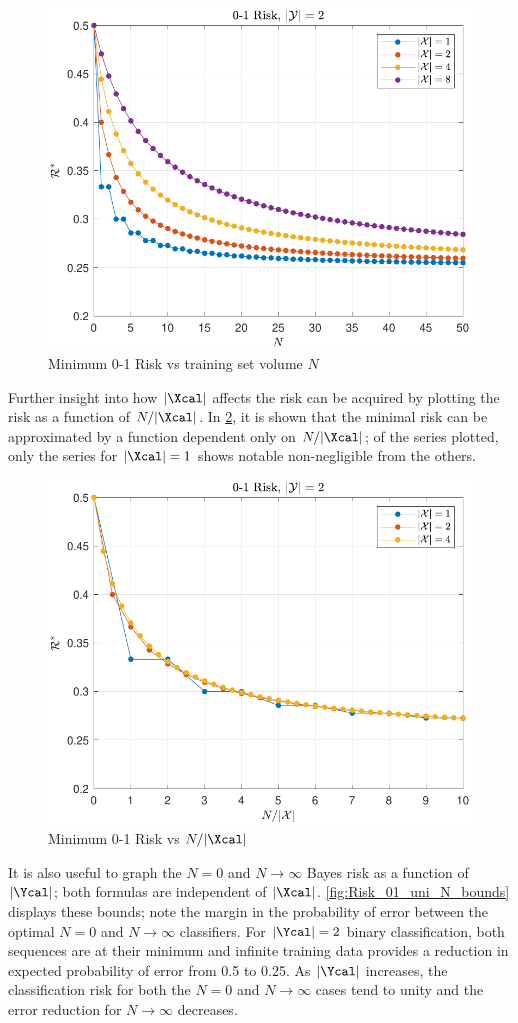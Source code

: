 \documentclass[12pt]{report}
\begin{document}
\begin{figure}
\centering
\includegraphics[width=0.7\linewidth]{Risk_01_uni_N_leg_Mx.pdf}
\caption{Minimum 0-1 Risk vs training set volume $N$}
\label{fig:Risk_01_uni_N_leg_Mx}
\end{figure}

Further insight into how $|\Xcal|$ affects the risk can be acquired by plotting the risk as a function of $N/|\Xcal|$. In \cref{fig:Risk_01_uni_N-Mx}, it is shown that the minimal risk can be approximated by a function dependent only on $N/|\Xcal|$; of the series plotted, only the series for $|\Xcal| = 1$ shows notable non-negligible from the others.

\begin{figure}
\centering
\includegraphics[width=0.7\linewidth]{Risk_01_uni_N-Mx.pdf}
\caption{Minimum 0-1 Risk vs $N/|\Xcal|$}
\label{fig:Risk_01_uni_N-Mx}
\end{figure}


It is also useful to graph the $N=0$ and $N \to \infty$ Bayes risk as a function of $|\Ycal|$; both formulas are independent of $|\Xcal|$. \cref{fig:Risk_01_uni_N_bounds} displays these bounds; note the margin in the probability of error between the optimal $N=0$ and $N \to \infty$ classifiers. For $|\Ycal| = 2$ binary classification, both sequences are at their minimum and infinite training data provides a reduction in expected probability of error from 0.5 to 0.25. As $|\Ycal|$ increases, the classification risk for both the $N=0$ and $N \to \infty$ cases tend to unity and the error reduction for $N \to \infty$ decreases. 
\end{document}
